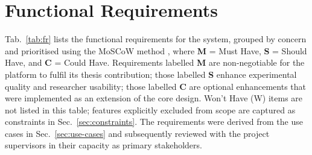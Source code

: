 \section{Functional Requirements}
\label{sec:functional-requirements}

Tab.~\ref{tab:fr} lists the functional requirements for the system, grouped by
concern and prioritised using the MoSCoW method \cite{clegg1994moscow}, where \textbf{M} = Must Have,
\textbf{S} = Should Have, and \textbf{C} = Could Have.
Requirements labelled \textbf{M} are non-negotiable for the platform to fulfil
its thesis contribution; those labelled \textbf{S} enhance experimental quality
and researcher usability; those labelled \textbf{C} are optional enhancements
that were implemented as an extension of the core design.
Won't Have (W) items are not listed in this table; features explicitly excluded
from scope are captured as constraints in Sec.~\ref{sec:constraints}.
The requirements were derived from the use cases in Sec.~\ref{sec:use-cases}
and subsequently reviewed with the project supervisors in their capacity as
primary stakeholders.

